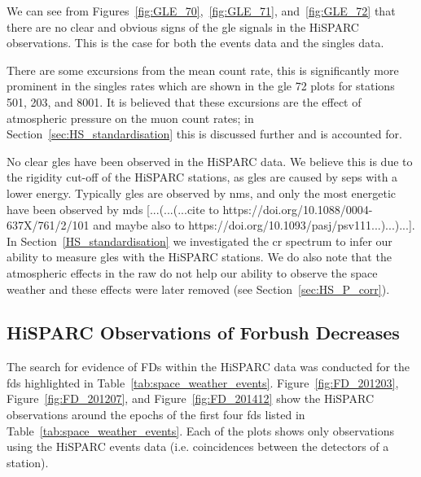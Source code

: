 We can see from Figures~\ref{fig:GLE_70},~\ref{fig:GLE_71}, and~\ref{fig:GLE_72} that there are no clear and obvious signs of the \gls{gle} signals in the HiSPARC observations. This is the case for both the events data and the singles data.

There are some excursions from the mean count rate, this is significantly more prominent in the singles rates which are shown in the \gls{gle} 72 plots for stations 501, 203, and 8001. It is believed that these excursions are the effect of atmospheric pressure on the muon count rates; in Section~\ref{sec:HS_standardisation} this is discussed further and is accounted for.

No clear \glspl{gle} have been observed in the HiSPARC data. We believe this is due to the rigidity cut-off of the HiSPARC stations, as \glspl{gle} are caused by \glspl{sep} with a lower energy. Typically \glspl{gle} are observed by \glspl{nm}, and only the most energetic have been observed by \glspl{md} [...(...(...cite to https://doi.org/10.1088/0004-637X/761/2/101 and maybe also to https://doi.org/10.1093/pasj/psv111...)...)...]. In Section~\ref{HS_standardisation} we investigated the \gls{cr} spectrum to infer our ability to measure \glspl{gle} with the HiSPARC stations. We do also note that the atmospheric effects in the raw do not help our ability to observe the space weather and these effects were later removed (see Section~\ref{sec:HS_P_corr}).


\subsection{HiSPARC Observations of Forbush Decreases}


The search for evidence of FDs within the HiSPARC data was conducted for the \glspl{fd} highlighted in Table~\ref{tab:space_weather_events}. Figure~\ref{fig:FD_201203}, Figure~\ref{fig:FD_201207}, and Figure~\ref{fig:FD_201412} show the HiSPARC observations around the epochs of the first four \glspl{fd} listed in Table~\ref{tab:space_weather_events}. Each of the plots shows only  observations using the HiSPARC events data (i.e. coincidences between the detectors of a station).


